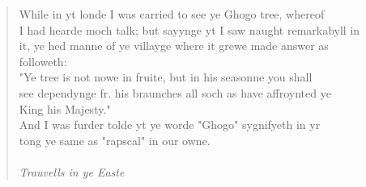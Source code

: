 \documentclass[11pt]{article}
\begin{document}
\begin{quote}       While in yt londe I was carried to see ye Ghogo tree, whereof \\
  I had hearde moch talk; but sayynge yt I saw naught remarkabyll in \\
  it, ye hed manne of ye villayge where it grewe made answer as \\
  followeth: \\
      "Ye tree is not nowe in fruite, but in his seasonne you shall \\
  see dependynge fr. his braunches all soch as have affroynted ye \\
  King his Majesty." \\
      And I was furder tolde yt ye worde "Ghogo" sygnifyeth in yr \\
  tong ye same as "rapscal" in our owne. \\
 \\
{\em Trauvells in ye Easte} \end{quote}
\end{document}
